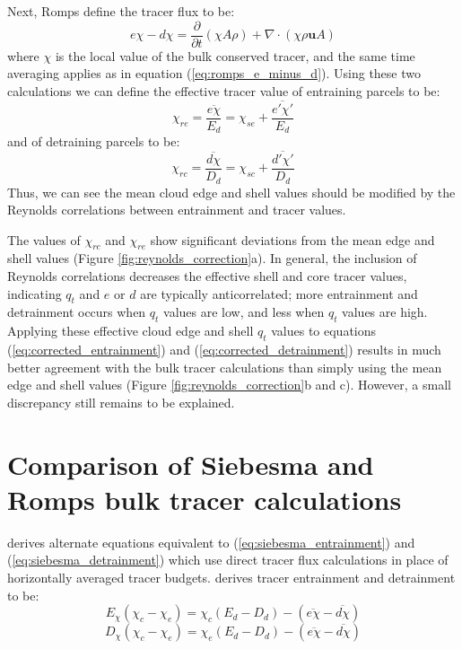 \documentclass[draft,grl]{agutex}
\begin{document}
\begin{article}
Next, Romps define the tracer flux to be:
\begin{equation}
  \label{eq:romps_echi_minus_dchi}
  e\chi - d\chi = \frac{\partial}{\partial t}(\chi A \rho) 
                + \nabla \cdot (\chi \rho \mathbf{u} A) 
\end{equation}
where $\chi$ is the local value of the bulk conserved tracer, and the same time 
averaging applies as in equation (\ref{eq:romps_e_minus_d}).  Using these two 
calculations we can define the effective tracer value of entraining parcels to 
be:
\begin{equation}
  \label{eq:chi_re}
  \chi_{re} = \frac{\overline{e\chi} }{E_d} 
            = \chi_{se} + \frac{\overline{e' \chi'}}{E_d}
\end{equation}
and of detraining parcels to be:
\begin{equation}
  \label{eq:chi_rc}
  \chi_{rc} = \frac{\overline{d\chi}}{D_d} 
            = \chi_{sc} + \frac{\overline{d' \chi'}}{D_d}
\end{equation}
Thus, we can see the mean cloud edge and shell values should be modified by 
the Reynolds correlations between entrainment and tracer values.

The values of $\chi_{rc}$ and $\chi_{re}$ show significant deviations from 
the mean edge and shell values (Figure \ref{fig:reynolds_correction}a).
In general, the inclusion of Reynolds correlations decreases the effective 
shell and core tracer values, indicating $q_t$ and $e$ or $d$ are typically 
anticorrelated; more entrainment and detrainment occurs when $q_t$ values are 
low, and less when $q_t$ values are high.  Applying these effective cloud edge 
and shell $q_t$ values to equations (\ref{eq:corrected_entrainment}) and 
(\ref{eq:corrected_detrainment}) results in much better agreement with the bulk 
tracer calculations than simply using the mean edge and shell values 
(Figure \ref{fig:reynolds_correction}b and c).  However, a small discrepancy 
still remains to be explained.


\section{Comparison of Siebesma and Romps bulk tracer calculations}

\cite{Romps2010} derives alternate equations equivalent to 
(\ref{eq:siebesma_entrainment}) and (\ref{eq:siebesma_detrainment}) which use
direct tracer flux calculations in place of horizontally averaged tracer 
budgets.  \cite{Romps2010} derives tracer entrainment and detrainment to be:
\begin{equation}
  \label{eq:romps_entrainment}
  E_{\chi}(\chi_{c} - \chi_{e}) = \chi_{c}(E_d-D_d) 
                                - (\overline{e\chi} - \overline{d\chi})
\end{equation}
\begin{equation}
  \label{eq:romps_detrainment}
  D_{\chi}(\chi_{c} - \chi_{e}) = \chi_{e}(E_d-D_d) 
                                - (\overline{e\chi} - \overline{d\chi})
\end{equation}


\end{article}
\end{document}
